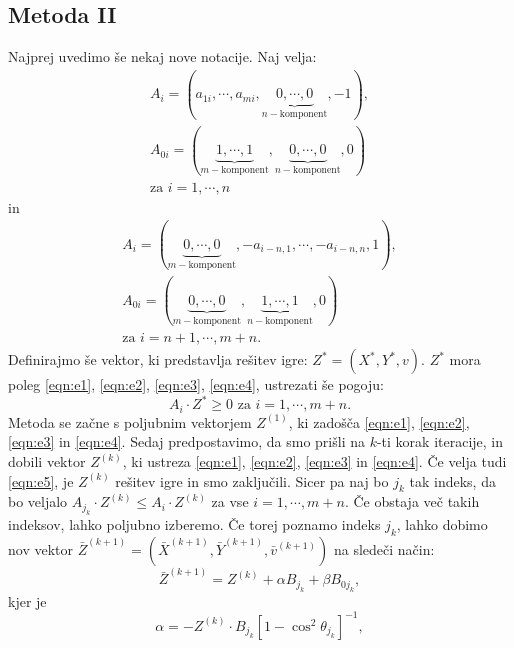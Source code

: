 \documentclass[a4paper,12pt]{article}
\begin{document}
\subsection{Metoda II}
Najprej uvedimo še nekaj nove notacije. Naj velja:
\begin{equation*}
    \begin{split}
    A_i = (a_{1i}, \cdots, a_{mi}, \underbrace{0, \cdots, 0}_{n - \text{komponent}}, -1), \\
    A_{0i} = (\underbrace{1, \cdots, 1}_{m-\text{komponent}}, \underbrace{0, \cdots, 0}_{n-\text{komponent}}, 0) \\
    \text{za} \, \, i = 1, \cdots, n
    \end{split}
\end{equation*} 
in 
\begin{equation*}
    \begin{split}
    A_i = (\underbrace{0, \cdots, 0}_{m - \text{komponent}},-a_{i-n, 1}, \cdots, -a_{i - n, n}, 1), \\
     A_{0i} = (\underbrace{0, \cdots, 0}_{m-\text{komponent}},\underbrace{1, \cdots, 1}_{n-\text{komponent}},  0) \\
    \text{za} \, \, i = n + 1, \cdots, m + n.
    \end{split}
\end{equation*} 
Definirajmo še vektor, ki predstavlja rešitev igre: $Z^* = (X^*, Y^*, v)$. $Z^*$ mora poleg \ref{eqn:e1}, \ref{eqn:e2}, \ref{eqn:e3}, \ref{eqn:e4}, ustrezati še pogoju:
\begin{equation}
\label{eqn:e5}
A_i \cdot Z^* \geq 0 \, \, \text{za} \, \, i = 1, \cdots, m + n.
\end{equation}
Metoda se začne s poljubnim vektorjem $Z^{(1)}$, ki zadošča \ref{eqn:e1}, \ref{eqn:e2}, \ref{eqn:e3} in \ref{eqn:e4}. Sedaj predpostavimo,
 da smo prišli na $k$-ti korak
iteracije, in dobili vektor $Z^{(k)}$,  ki ustreza \ref{eqn:e1}, \ref{eqn:e2}, \ref{eqn:e3} in \ref{eqn:e4}. Če velja tudi
\ref{eqn:e5}, je $Z^{(k)}$ rešitev igre in smo zaključili. Sicer pa naj bo $j_k$ tak indeks, da bo veljalo
$A_{j_k} \cdot Z^{(k)} \leq A_i \cdot Z^{(k)}$ za vse $i = 1, \cdots, m + n$. Če obstaja več takih indeksov, lahko poljubno izberemo.
 Če torej poznamo indeks $j_k$, lahko
dobimo nov vektor $\bar{Z}^{(k+1)} = (\bar{X}^{(k+1)}, \bar{Y}^{(k+1)}, \bar{v}^{(k+1)})$ na sledeči način:
\begin{equation*}
    \bar{Z}^{(k+1)} = Z^{(k)} + \alpha B_{j_k} + \beta B_{0j_k},
\end{equation*}
kjer je
\begin{equation*}
    \alpha = - Z^{(k)} \cdot B_{j_k} [1 - \cos^2{\theta_{j_k}}]^{-1},
\end{equation*}
\end{document}
